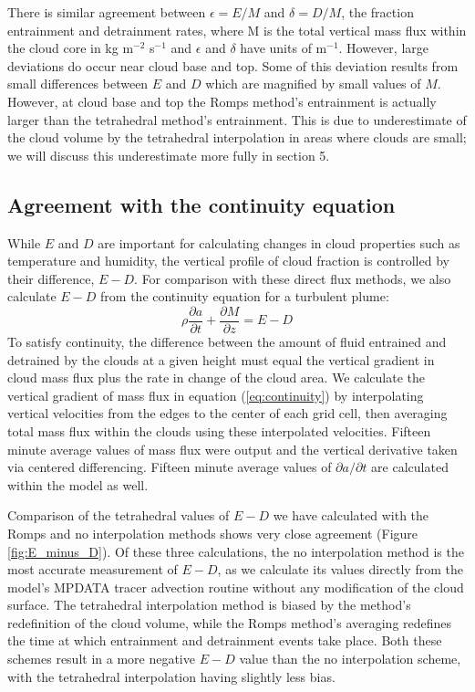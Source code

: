 \documentclass[12pt]{article}
\begin{document}
There is similar agreement between $\epsilon = E/M$ and $\delta = D/M$, the 
fraction entrainment and detrainment rates, where M is the total vertical 
mass flux within the cloud core in kg m$^{-2}$ s$^{-1}$ and $\epsilon$ and 
$\delta$ have units of m$^{-1}$.  However, large deviations do occur near 
cloud base and top. Some of this deviation results from small differences 
between $E$ and $D$ which are magnified by small values of $M$.  However, at
cloud base and top the Romps method's entrainment is actually larger than the
tetrahedral method's entrainment.  This is due to underestimate of the cloud 
volume by the tetrahedral interpolation in areas where clouds are small; we 
will discuss this underestimate more fully in section 5.  

\subsection{Agreement with the continuity equation}

While $E$ and $D$ are important for calculating changes in cloud properties 
such as temperature and humidity, the vertical profile of cloud fraction is
controlled by their difference, $E-D$.  For comparison with these direct 
flux methods, we also calculate $E-D$ from the continuity equation for a 
turbulent plume: 
\begin{equation}
    \label{eq:continuity}
    \rho \frac{\partial a}{\partial t} 
    + \frac{\partial M}{\partial z}
    = E - D
\end{equation}
To satisfy continuity, the difference between the amount of fluid 
entrained and detrained by the clouds at a given height must equal the 
vertical gradient in cloud mass flux plus the rate in change of the cloud area.
We calculate the vertical gradient of mass flux in equation 
(\ref{eq:continuity}) by interpolating vertical velocities from the edges to 
the center of each grid cell, then averaging total mass flux within the clouds 
using these interpolated velocities.  Fifteen minute average values of mass 
flux were output and the vertical derivative taken via centered differencing.  
Fifteen minute average values of $\partial a/\partial t$ are calculated within 
the model as well.  

Comparison of the tetrahedral values of $E-D$ we have calculated with the
Romps and no interpolation methods shows very close agreement (Figure 
\ref{fig:E_minus_D}).  Of these three calculations, the no interpolation method 
is the most accurate measurement of $E-D$, as we calculate its values directly 
from the model's MPDATA tracer advection routine 
\citep{Smolarkiewicz1990,Khairoutdinov2003} without any modification of the 
cloud surface.  The tetrahedral interpolation method is biased by the method's 
redefinition of the cloud volume, while the Romps method's averaging redefines 
the time at which entrainment and detrainment events take place.  Both these 
schemes result in a more negative $E-D$ value than the no interpolation 
scheme, with the tetrahedral interpolation having slightly less bias.
\end{document}

